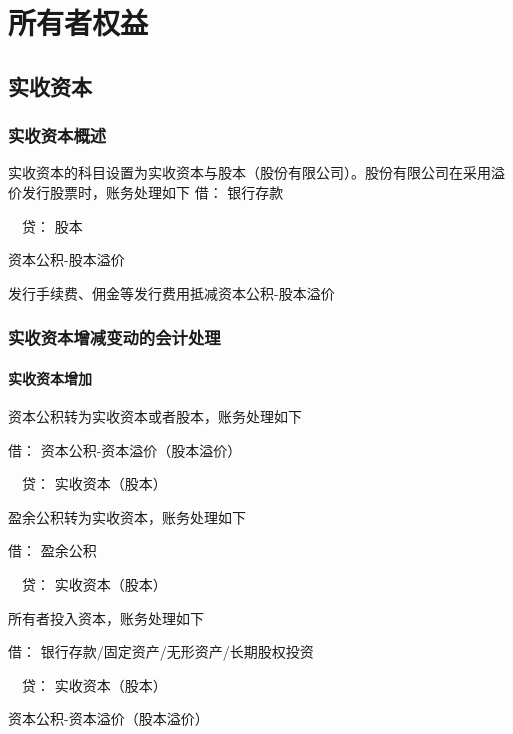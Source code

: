 \documentclass[UTF8,12pt]{ctexart}
\newenvironment{Dr}{\noindent 借：}{\par}
\newenvironment{Cr}{\noindent \ \ 贷：}{\par}
\numberwithin{equation}{section} %
\numberwithin{figure}{section}
\numberwithin{table}{section}
\begin{document}
	
	\newpage
	\section{所有者权益}
	\subsection{实收资本}
	
	\subsubsection{实收资本概述}
	实收资本的科目设置为实收资本与股本（股份有限公司）。股份有限公司在采用溢价发行股票时，账务处理如下
	\begin{Dr}
		银行存款
	\end{Dr}
	\begin{Cr}
		股本
		
		资本公积-股本溢价
	\end{Cr}
	发行手续费、佣金等发行费用抵减资本公积-股本溢价
	
	\subsubsection{实收资本增减变动的会计处理}
	\paragraph{实收资本增加}

	资本公积转为实收资本或者股本，账务处理如下
	
	\begin{Dr}
		资本公积-资本溢价（股本溢价）
	\end{Dr}
	\begin{Cr}
		实收资本（股本）
	\end{Cr}

	盈余公积转为实收资本，账务处理如下
	
	\begin{Dr}
		盈余公积
	\end{Dr}
	\begin{Cr}
		实收资本（股本）
	\end{Cr}

	所有者投入资本，账务处理如下
	
	\begin{Dr}
		银行存款/固定资产/无形资产/长期股权投资
	\end{Dr}
	\begin{Cr}
		实收资本（股本）
		
		资本公积-资本溢价（股本溢价）
	\end{Cr}
\end{document}
